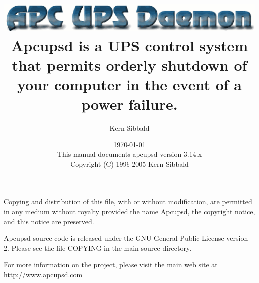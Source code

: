 \documentclass[11pt,a4paper]{report}
\begin{document}
\sloppy

\parskip 10pt
\parindent 0pt

\title{\includegraphics{./apcupsd.eps} \\ \bigskip
   \Large{Apcupsd is a UPS control system that permits
   orderly shutdown of your
   computer in the event of a power failure.} }
\author{Kern Sibbald}
\date{\vspace{2.0in}\today \\
      This manual documents apcupsd version 3.14.x \\
Copyright (C) 1999-2005 Kern Sibbald }


\maketitle

Copying and distribution of this file, with or without
modification, are permitted in any medium without royalty
provided the name Apcupsd, the copyright notice, and this notice
are preserved.

Apcupsd source code is released under the GNU General Public
License version 2. Please see the file COPYING in the main source
directory.

For more information on the project, please visit the main web
site at http://www.apcupsd.com

\clearpage
\tableofcontents
\clearpage
\listoffigures
\clearpage
\listoftables
\clearpage


\printindex
\end{document}
